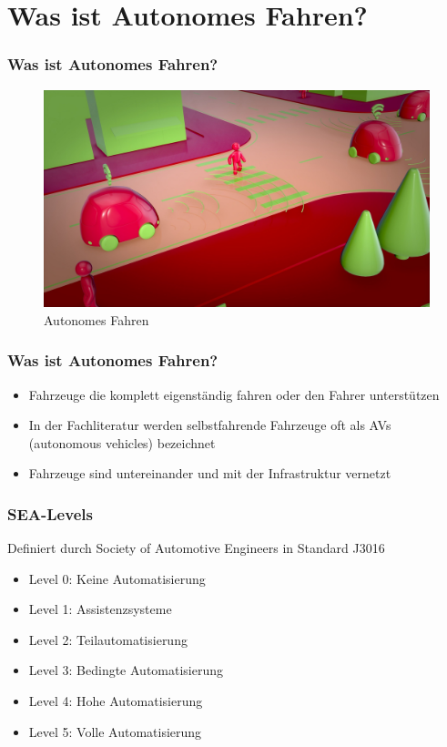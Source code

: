 \section{Was ist Autonomes Fahren?}

\begin{frame}
    \frametitle{Was ist Autonomes Fahren?}

    \begin{figure}[H]
        \centering
        \includegraphics[width=1.0\textwidth]{resources/images/car-4343633_1920.jpg}
        \caption{Autonomes Fahren \cite{car1_img}}
    \end{figure}
\end{frame}

\begin{frame}
    \frametitle{Was ist Autonomes Fahren?}
    
    \begin{itemize}
        \item Fahrzeuge die komplett eigenständig fahren oder den Fahrer unterstützen
        \item In der Fachliteratur werden selbstfahrende Fahrzeuge oft als AVs (autonomous vehicles) bezeichnet
        \item Fahrzeuge sind untereinander und mit der Infrastruktur vernetzt
    \end{itemize}
\end{frame}

\begin{frame}
    \frametitle{SEA-Levels}

    Definiert durch Society of Automotive Engineers \cite{websiteSAE} in Standard J3016 \cite{standardSAE}

    \begin{itemize}
        \item Level 0: Keine Automatisierung
        \item Level 1: Assistenzsysteme
        \item Level 2: Teilautomatisierung
        \item Level 3: Bedingte Automatisierung
        \item Level 4: Hohe Automatisierung
        \item Level 5: Volle Automatisierung
    \end{itemize}
\end{frame}